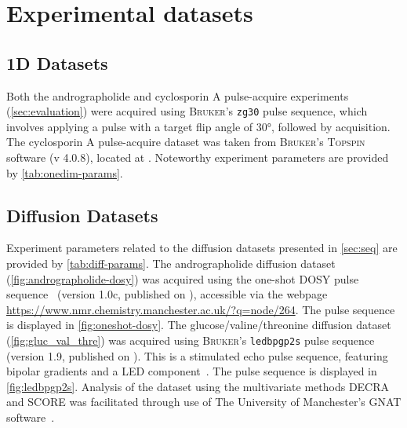 

\section{Experimental datasets}

\subsection{\acs{1D} Datasets}

Both the andrographolide and cyclosporin A pulse-acquire experiments
(\cref{sec:evaluation}) were acquired using \textsc{Bruker}'s \texttt{zg30}
pulse sequence, which involves applying a pulse with a target flip angle of
\ang{30}, followed by acquisition.  The cyclosporin A pulse-acquire dataset was
taken from \textsc{Bruker}'s \textsc{Topspin} software (v 4.0.8), located at
.  Noteworthy experiment
parameters are provided by \cref{tab:onedim-params}.

\subsection{Diffusion Datasets}

Experiment parameters related to the diffusion datasets presented in
\cref{sec:seq} are provided by \cref{tab:diff-params}.
The andrographolide diffusion dataset (\cref{fig:andrographolide-dosy})
was acquired using the one-shot \ac{DOSY} pulse sequence~\cite{Pelta2002}
(version 1.0c, published on ), accessible via the webpage
\url{https://www.nmr.chemistry.manchester.ac.uk/?q=node/264}. The pulse
sequence is displayed in \cref{fig:oneshot-dosy}.
The glucose/valine/threonine diffusion dataset (\cref{fig:gluc_val_thre})
was acquired using \textsc{Bruker}'s \texttt{ledbpgp2s} pulse sequence (version 1.9, published on
). This is a stimulated echo pulse sequence, featuring
bipolar gradients and a \ac{LED} component~\cite{Wu1995}. The pulse sequence is
displayed in \cref{fig:ledbpgp2s}.
Analysis of the dataset using the multivariate methods \ac{DECRA} and
\ac{SCORE} was facilitated through use of The University of Manchester's
\ac{GNAT} software~\cite{Castanar2018}.

